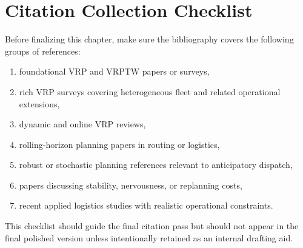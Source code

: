 \section{Citation Collection Checklist}

Before finalizing this chapter, make sure the bibliography covers the following groups of references:

\begin{enumerate}
    \item foundational VRP and VRPTW papers or surveys,
    \item rich VRP surveys covering heterogeneous fleet and related operational extensions,
    \item dynamic and online VRP reviews,
    \item rolling-horizon planning papers in routing or logistics,
    \item robust or stochastic planning references relevant to anticipatory dispatch,
    \item papers discussing stability, nervousness, or replanning costs,
    \item recent applied logistics studies with realistic operational constraints.
\end{enumerate}

This checklist should guide the final citation pass but should not appear in the final polished version unless intentionally retained as an internal drafting aid.
